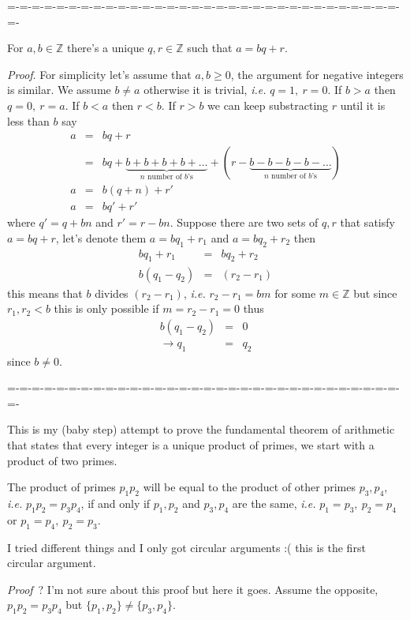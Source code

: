 \documentclass[aps,preprint,preprintnumbers,nofootinbib,showpacs,prd]{revtex4-1}
\newcommand{\ie}{{\it i.e.} }
\newcommand{\nbea}{\begin{eqnarray*}}
\newcommand{\neea}{\end{eqnarray*}}
\begin{document}
=-=-=-=-=-=-=-=-=-=-=-=-=-=-=-=-=-=-=-=-=-=-=-=-=-=-=-=-=-=-=-=-=-

For $a,b \in \mathbb{Z}$ there's a unique $q,r \in \mathbb{Z}$ such that $a = bq + r$.

{\it Proof}. For simplicity let's assume that $a,b \ge 0$, the argument for negative integers is similar. We assume $b \neq a$ otherwise it is trivial, \ie $q = 1,~ r = 0$. If $b > a$ then $q = 0,~ r = a$. If $b < a$ then $r < b$. If $r > b$ we can keep substracting $r$ until it is less than $b$ say
%
\nbea
a & = & bq + r \\
& = & bq + \underbrace{b + b + b + b + \dots}_\text{$n$ number of $b$'s} + (r -\underbrace{b - b - b - b - \dots}_\text{$n$ number of $b$'s} ) \\
a & = & b (q+n) + r' \\
a & = & b q' + r'
\neea
%
where $q' = q + bn$ and $r' = r - bn$. Suppose there are two sets of $q,r$ that satisfy $a = bq + r$, let's denote them $a = bq_1 + r_1$ and $a = bq_2 + r_2$ then
%
\nbea
bq_1 + r_1 & = & bq_2 + r_2 \\
b(q_1 - q_2) & = & (r_2 - r_1)
\neea
%
this means that $b$ divides $(r_2 - r_1)$, \ie $r_2 - r_1 = bm$ for some $m \in \mathbb{Z}$ but since $r_1, r_2 < b$ this is only possible if $m = r_2 - r_1 = 0$ thus
%
\nbea
b(q_1 - q_2) & = & 0 \\
\to q_1 & = & q_2
\neea
%
since $b \neq 0$.


=-=-=-=-=-=-=-=-=-=-=-=-=-=-=-=-=-=-=-=-=-=-=-=-=-=-=-=-=-=-=-=-=-

This is my (baby step) attempt to prove the fundamental theorem of arithmetic that states that every integer is a unique product of primes, we start with a product of two primes.

The product of primes $p_1 p_2$ will be equal to the product of other primes $p_3, p_4$, \ie $p_1 p_2 = p_3 p_4$, if and only if $p_1, p_2$ and $p_3, p_4$ are the same, \ie $p_1 = p_3,~ p_2 = p_4$ or $p_1 = p_4,~ p_2 = p_3$.

I tried different things and I only got circular arguments :( this is the first circular argument.

{\it Proof}~? I'm not sure about this proof but here it goes. Assume the opposite, $p_1 p_2 = p_3 p_4$ but $\{p_1,p_2\} \neq \{p_3, p_4\}$.
\end{document}

